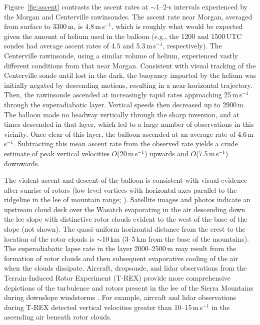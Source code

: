\documentclass[pdftex,12pt]{article}
\def\mps{m\,s$^{-1}$}
\def\around{$\sim$}
\begin{document}
Figure~\ref{fig:ascent} contrasts the ascent rates at \around 1--2-s intervals experienced by the Morgan and Centerville rawinsondes. The ascent rate near Morgan, averaged from surface to 3300\,m, is 4.8\,\mps, which is roughly what would be expected given the amount of helium used in the balloon (e.g., the 1200 and 1500\,UTC sondes had average ascent rates of 4.5 and 5.3\,\mps, respectively). The Centerville rawinsonde, using a similar volume of helium, experienced vastly different conditions from that near Morgan. Consistent with visual tracking of the Centerville sonde until lost in the dark, the buoyancy imparted by the helium was initially negated by descending motions, resulting in a near-horizontal trajectory. Then, the rawinsonde ascended at increasingly rapid rates approaching 25\,\mps{} through the superadiabatic layer. Vertical speeds then decreased up to 2900\,m. The balloon made no headway vertically through the sharp inversion, and at times descended in that layer, which led to a large number of observations in this vicinity. Once clear of this layer, the balloon ascended at an average rate of 4.6\,\mps. Subtracting this mean ascent rate from the observed rate yields a crude estimate of peak vertical velocities $O$(20\,\mps) upwards and $O$(7.5\,\mps) downwards.

The violent ascent and descent of the balloon is consistent with visual evidence after sunrise of rotors (low-level vortices with horizontal axes parallel to the ridgeline in the lee of mountain range; \citealt{Doyle2002}). Satellite images and photos indicate an upstream cloud deck over the Wasatch evaporating in the air descending down the lee slope with distinctive rotor clouds evident to the west of the base of the slope (not shown). The quasi-uniform horizontal distance from the crest to the location of the rotor clouds is \around 10\,km (3--5\,km from the base of the mountains). The superadiabatic lapse rate in the layer 2000--2500\,m may result from the formation of rotor clouds and then subsequent evaporative cooling of the air when the clouds dissipate. Aircraft, dropsonde, and lidar observations from the Terrain-Induced Rotor Experiment (T-REX) provide more comprehensive depictions of the turbulence and rotors present in the lee of the Sierra Mountains during downslope windstorms \citep{Armi2011,Kuhnlein2013-gt}. For example, aircraft and lidar observations during T-REX detected vertical velocities greater than 10--15\,\mps{} in the ascending air beneath rotor clouds.
\end{document}
